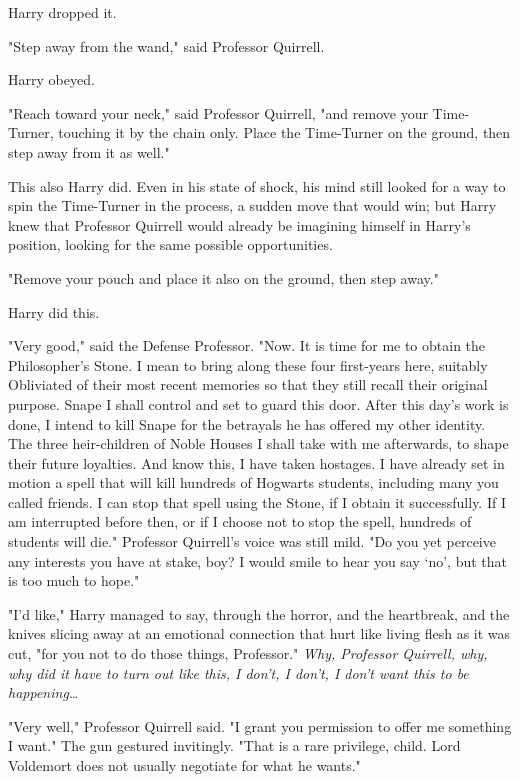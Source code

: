 Harry dropped it.

"Step away from the wand," said Professor Quirrell.

Harry obeyed.

"Reach toward your neck," said Professor Quirrell, "and remove your 
Time-Turner, touching it by the chain only. Place the Time-Turner on the 
ground, then step away from it as well."

This also Harry did. Even in his state of shock, his mind still looked for a 
way to spin the Time-Turner in the process, a sudden move that would win; but 
Harry knew that Professor Quirrell would already be imagining himself in 
Harry's position, looking for the same possible opportunities.

"Remove your pouch and place it also on the ground, then step away."

Harry did this.

"Very good," said the Defense Professor. "Now. It is time for me to obtain the 
Philosopher's Stone. I mean to bring along these four first-years here, 
suitably Obliviated of their most recent memories so that they still recall 
their original purpose. Snape I shall control and set to guard this door. After 
this day's work is done, I intend to kill Snape for the betrayals he has 
offered my other identity. The three heir-children of Noble Houses I shall take 
with me afterwards, to shape their future loyalties. And know this, I have 
taken hostages. I have already set in motion a spell that will kill hundreds of 
Hogwarts students, including many you called friends. I can stop that spell 
using the Stone, if I obtain it successfully. If I am interrupted before then, 
or if I choose not to stop the spell, hundreds of students will die." Professor 
Quirrell's voice was still mild. "Do you yet perceive any interests you have at 
stake, boy? I would smile to hear you say `no', but that is too much to hope."

"I'd like," Harry managed to say, through the horror, and the heartbreak, and 
the knives slicing away at an emotional connection that hurt like living flesh 
as it was cut, "for you not to do those things, Professor." \emph{Why, 
Professor Quirrell, why, why did it have to turn out like this, I don't, I 
don't, I don't want this to be happening{\ldots}}

"Very well," Professor Quirrell said. "I grant you permission to offer me 
something I want." The gun gestured invitingly. "That is a rare privilege, 
child. Lord Voldemort does not usually negotiate for what he wants."

